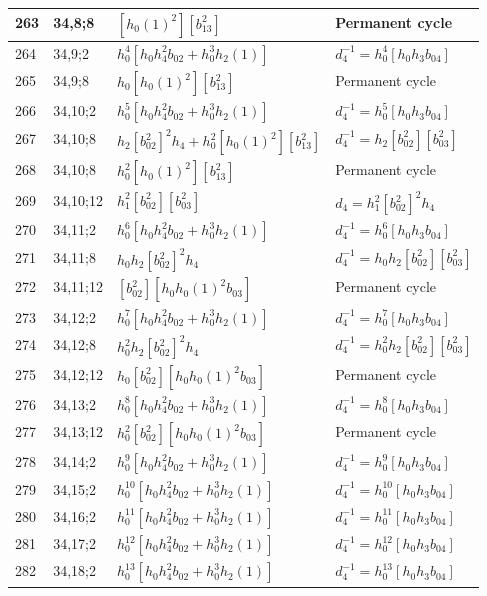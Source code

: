 \documentclass{article}
\begin{document}
\begin{longtable}{|l|l|>{\raggedright\arraybackslash}p{6cm}|>{\raggedright\arraybackslash}p{6cm}|}
263 & 34,8;8 & $[h_0(1)^2][b_{13}^2]$ & Permanent cycle\\
\hline
264 & 34,9;2 & $h_0^4[h_0h_4^2b_{02} + h_0^3h_2(1)]$ & $d_{4}^{-1}=h_0^4[h_0h_3b_{04}]$\\
\hline
265 & 34,9;8 & $h_0[h_0(1)^2][b_{13}^2]$ & Permanent cycle\\
\hline
266 & 34,10;2 & $h_0^5[h_0h_4^2b_{02} + h_0^3h_2(1)]$ & $d_{4}^{-1}=h_0^5[h_0h_3b_{04}]$\\
\hline
267 & 34,10;8 & $h_2[b_{02}^2]^2h_4 + h_0^2[h_0(1)^2][b_{13}^2]$ & $d_{4}^{-1}=h_2[b_{02}^2][b_{03}^2]$\\
268 & 34,10;8 & $h_0^2[h_0(1)^2][b_{13}^2]$ & Permanent cycle\\
\hline
269 & 34,10;12 & $h_1^2[b_{02}^2][b_{03}^2]$ &$d_{4}=h_1^2[b_{02}^2]^2h_4$\\
\hline
270 & 34,11;2 & $h_0^6[h_0h_4^2b_{02} + h_0^3h_2(1)]$ & $d_{4}^{-1}=h_0^6[h_0h_3b_{04}]$\\
\hline
271 & 34,11;8 & $h_0h_2[b_{02}^2]^2h_4$ & $d_{4}^{-1}=h_0h_2[b_{02}^2][b_{03}^2]$\\
\hline
272 & 34,11;12 & $[b_{02}^2][h_0h_0(1)^2b_{03}]$ & Permanent cycle\\
\hline
273 & 34,12;2 & $h_0^7[h_0h_4^2b_{02} + h_0^3h_2(1)]$ & $d_{4}^{-1}=h_0^7[h_0h_3b_{04}]$\\
\hline
274 & 34,12;8 & $h_0^2h_2[b_{02}^2]^2h_4$ & $d_{4}^{-1}=h_0^2h_2[b_{02}^2][b_{03}^2]$\\
\hline
275 & 34,12;12 & $h_0[b_{02}^2][h_0h_0(1)^2b_{03}]$ & Permanent cycle\\
\hline
276 & 34,13;2 & $h_0^8[h_0h_4^2b_{02} + h_0^3h_2(1)]$ & $d_{4}^{-1}=h_0^8[h_0h_3b_{04}]$\\
\hline
277 & 34,13;12 & $h_0^2[b_{02}^2][h_0h_0(1)^2b_{03}]$ & Permanent cycle\\
\hline
278 & 34,14;2 & $h_0^9[h_0h_4^2b_{02} + h_0^3h_2(1)]$ & $d_{4}^{-1}=h_0^9[h_0h_3b_{04}]$\\
\hline
279 & 34,15;2 & $h_0^{10}[h_0h_4^2b_{02} + h_0^3h_2(1)]$ & $d_{4}^{-1}=h_0^{10}[h_0h_3b_{04}]$\\
\hline
280 & 34,16;2 & $h_0^{11}[h_0h_4^2b_{02} + h_0^3h_2(1)]$ & $d_{4}^{-1}=h_0^{11}[h_0h_3b_{04}]$\\
\hline
281 & 34,17;2 & $h_0^{12}[h_0h_4^2b_{02} + h_0^3h_2(1)]$ & $d_{4}^{-1}=h_0^{12}[h_0h_3b_{04}]$\\
\hline
282 & 34,18;2 & $h_0^{13}[h_0h_4^2b_{02} + h_0^3h_2(1)]$ & $d_{4}^{-1}=h_0^{13}[h_0h_3b_{04}]$\\

\end{longtable}
\end{document}
